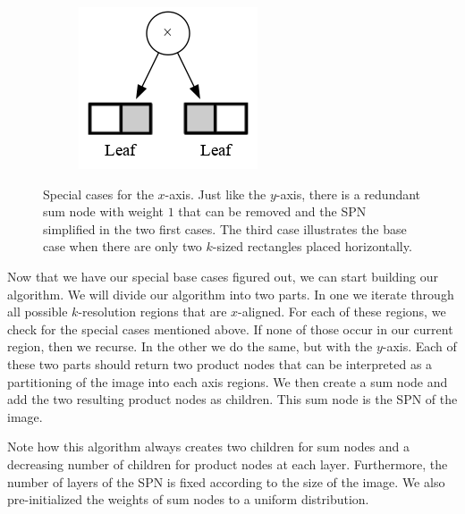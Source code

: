 \documentclass{amsart}
\theoremstyle{plain}
\numberwithin{equation}{section}
\begin{document}
\begin{figure}[h]
\begin{subfigure}[b]{0.3\linewidth}
  \end{subfigure}
  \begin{subfigure}[b]{0.3\linewidth}
    \centering\includegraphics[scale=0.35]{graphs/cc6.png}
    \caption{\label{fig:basex-2}}
  \end{subfigure}
  \captionsetup{justification=raggedright}
  \caption{Special cases for the $x$-axis. Just like the $y$-axis, there is a redundant sum node
  with weight $1$ that can be removed and the SPN simplified in the two first cases. The third case
  illustrates the base case when there are only two $k$-sized rectangles placed horizontally.}\label{fig:basex}
\end{figure}

Now that we have our special base cases figured out, we can start building our algorithm. We will
divide our algorithm into two parts. In one we iterate through all possible $k$-resolution regions
that are $x$-aligned. For each of these regions, we check for the special cases mentioned above. If
none of those occur in our current region, then we recurse. In the other we do the same, but with
the $y$-axis. Each of these two parts should return two product nodes that can be interpreted as a
partitioning of the image into each axis regions. We then create a sum node and add the two
resulting product nodes as children. This sum node is the SPN of the image.

Note how this algorithm always creates two children for sum nodes and a decreasing number of
children for product nodes at each layer. Furthermore, the number of layers of the SPN is fixed
according to the size of the image. We also pre-initialized the weights of sum nodes to a uniform
distribution.
\end{document}

